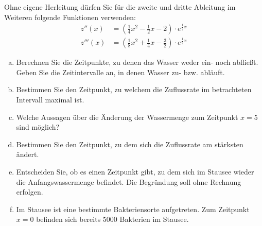 \begin{exercise}
\begin{center}
    \end{center}
    Ohne eigene Herleitung dürfen Sie für die zweite und dritte Ableitung
    im Weiteren folgende Funktionen verwenden:
    \begin{equation*}
      \begin{split}
         z''(x)&=\left(\frac{1}{4}x^2-\frac{1}{2}x-2\right)\cdot e^{\frac{1}{2}x} \\[2ex]
        z'''(x)&=\left(\frac{1}{8}x^2+\frac{1}{4}x-\frac{3}{2}\right)\cdot e^{\frac{1}{2}x}
      \end{split}
    \end{equation*}
    \begin{enumerate}[a)]
      \item Berechnen Sie die Zeitpunkte, zu denen das Wasser weder ein- noch abfließt.
            Geben Sie die Zeitintervalle an, in denen Wasser zu- bzw. abläuft.
      \item Bestimmen Sie den Zeitpunkt, zu welchem die Zuflussrate im betrachteten
            Intervall maximal ist.
      \item Welche Aussagen über die Änderung der Wassermenge zum Zeitpunkt
            $x=5$ sind möglich?
      \item Bestimmen Sie den Zeitpunkt, zu dem sich die Zuflussrate am stärksten ändert.
      \item Entscheiden Sie, ob es einen Zeitpunkt gibt, zu dem sich im Stausee wieder
            die Anfangswassermenge befindet. Die Begründung soll ohne Rechnung erfolgen.
      \item Im Stausee ist eine bestimmte Bakteriensorte aufgetreten.
            Zum Zeitpunkt $x=0$ befinden sich bereits \num{5000} Bakterien im Stausee.

\end{enumerate}
\end{exercise}
